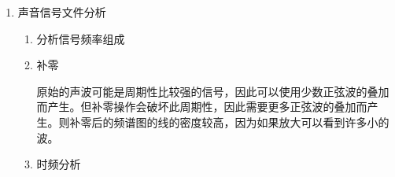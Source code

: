 \begin{enumerate}
\newpage

    \item 声音信号文件分析
    
    \begin{enumerate}
        \item 分析信号频率组成
        \begin{figure}[h!]
            \centering
            \scalebox{0.7}{}
        \end{figure}
        \item 补零
        \begin{figure}[h!]
            \centering
            \scalebox{0.7}{}
        \end{figure}

        原始的声波可能是周期性比较强的信号，因此可以使用少数正弦波的叠加而产生。但补零操作会破坏此周期性，因此需要更多正弦波的叠加而产生。则补零后的频谱图的线的密度较高，因为如果放大可以看到许多小的波。

        \newpage

        \item 时频分析


\end{enumerate}
\end{enumerate}
